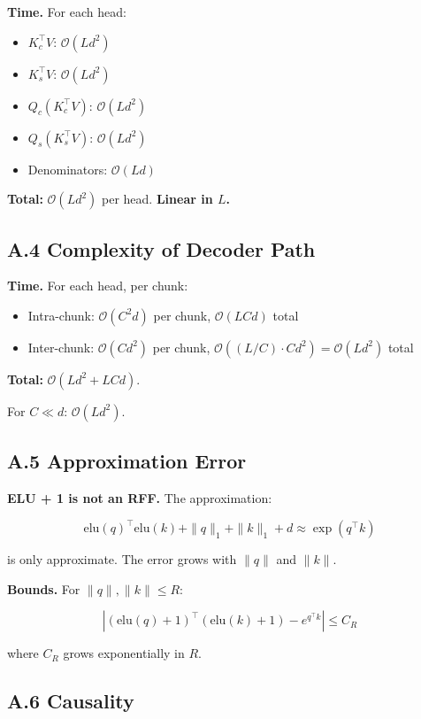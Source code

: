 \textbf{Time.} For each head:
\begin{itemize}
\item $K_c^\top V$: $\mathcal{O}(L d^2)$
\item $K_s^\top V$: $\mathcal{O}(L d^2)$
\item $Q_c (K_c^\top V)$: $\mathcal{O}(L d^2)$
\item $Q_s (K_s^\top V)$: $\mathcal{O}(L d^2)$
\item Denominators: $\mathcal{O}(L d)$

\end{itemize}
\textbf{Total:} $\mathcal{O}(L d^2)$ per head. \textbf{Linear in $L$.}

\subsection{A.4 Complexity of Decoder Path}

\textbf{Time.} For each head, per chunk:
\begin{itemize}
\item Intra-chunk: $\mathcal{O}(C^2 d)$ per chunk, $\mathcal{O}(L C d)$ total
\item Inter-chunk: $\mathcal{O}(C d^2)$ per chunk, $\mathcal{O}((L/C) \cdot C d^2) = \mathcal{O}(L d^2)$ total

\end{itemize}
\textbf{Total:} $\mathcal{O}(L d^2 + L C d)$.

For $C \ll d$: $\mathcal{O}(L d^2)$.

\subsection{A.5 Approximation Error}

\textbf{ELU + 1 is not an RFF.} The approximation:

\[
\text{elu}(q)^\top \text{elu}(k) + \|q\|_1 + \|k\|_1 + d \approx \exp(q^\top k)
\]

is only approximate. The error grows with $\|q\|$ and $\|k\|$.

\textbf{Bounds.} For $\|q\|, \|k\| \leq R$:

\[
\left|(\text{elu}(q)+1)^\top(\text{elu}(k)+1) - e^{q^\top k}\right| \leq C_R
\]

where $C_R$ grows exponentially in $R$.

\subsection{A.6 Causality}

